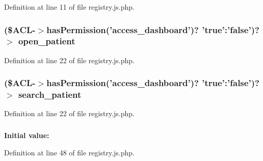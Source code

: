 \-Definition at line 11 of file registry.\-js.\-php.

\hypertarget{registry_8js_8php_a24c830a005c6465b104572d9743cd879}{
\subsubsection[{open\-\_\-patient}]{ (\${\bf \-A\-C\-L}-\/$>$has\-Permission('access\-\_\-dashboard')? 'true'\-:'false')?$>$ {\bf open\-\_\-patient}}}\label{registry_8js_8php_a24c830a005c6465b104572d9743cd879}


\-Definition at line 22 of file registry.\-js.\-php.

\hypertarget{registry_8js_8php_aa992f07730be62ab3df228e1f588b581}{
\subsubsection[{search\-\_\-patient}]{ (\${\bf \-A\-C\-L}-\/$>$has\-Permission('access\-\_\-dashboard')? 'true'\-:'false')?$>$ {\bf search\-\_\-patient}}}\label{registry_8js_8php_aa992f07730be62ab3df228e1f588b581}


\-Definition at line 22 of file registry.\-js.\-php.

\hypertarget{registry_8js_8php_a4b6ad35871b2d44923f2a793f11029b0}{
\subsubsection[{setting}]{}}\label{registry_8js_8php_a4b6ad35871b2d44923f2a793f11029b0}
{\bfseries \-Initial value\-:}
\begin{DoxyCode}
 {

}
\end{DoxyCode}


\-Definition at line 48 of file registry.\-js.\-php.


